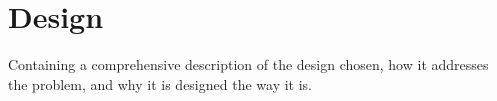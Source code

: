 \chapter{Design}

Containing a comprehensive description of the design chosen, how it addresses the problem, and why it is designed the way it is.

